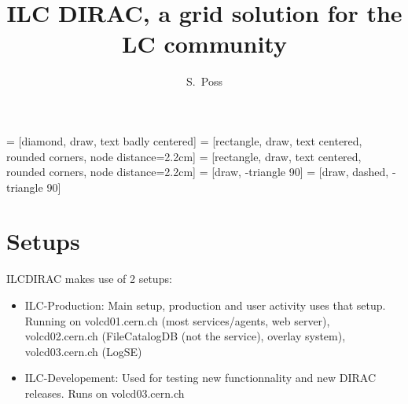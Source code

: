 \documentclass[a4paper,12pt]{article}
\title{ILC DIRAC, a grid solution for the LC community}
\author{S.~Poss}
\begin{document}
 = [diamond, draw, text badly centered]
 = [rectangle, draw, text centered, rounded corners, node distance=2.2cm]
 = [rectangle, draw, text centered, rounded corners, node distance=2.2cm]
 = [draw, -triangle 90]
 = [draw, dashed, -triangle 90]

\maketitle
{}

\tableofcontents

\section{Setups}
ILCDIRAC makes use of 2 setups:
\begin{itemize}
  \item ILC-Production: Main setup, production and user activity uses that
  setup. Running on volcd01.cern.ch (most services/agents, web server),
  volcd02.cern.ch (FileCatalogDB (not the service), overlay system), volcd03.cern.ch (LogSE)
  \item ILC-Developement: Used for testing new functionnality and new DIRAC
  releases. Runs on volcd03.cern.ch
\end{itemize}
\end{document}
